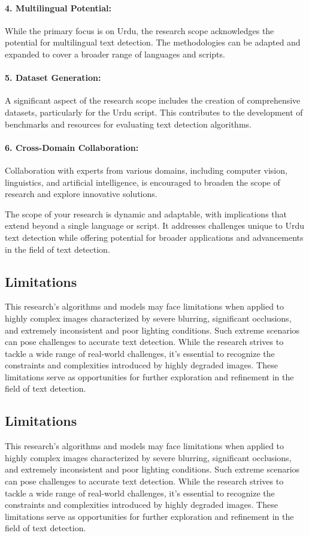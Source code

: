 \paragraph{4. Multilingual Potential:} \hfill \break
While the primary focus is on Urdu, the research scope acknowledges the potential for multilingual text detection. The methodologies can be adapted and expanded to cover a broader range of languages and scripts.

\paragraph{5. Dataset Generation:} \hfill \break
A significant aspect of the research scope includes the creation of comprehensive datasets, particularly for the Urdu script. This contributes to the development of benchmarks and resources for evaluating text detection algorithms.

\paragraph{6. Cross-Domain Collaboration:} \hfill \break
Collaboration with experts from various domains, including computer vision, linguistics, and artificial intelligence, is encouraged to broaden the scope of research and explore innovative solutions.

The scope of your research is dynamic and adaptable, with implications that extend beyond a single language or script. It addresses challenges unique to Urdu text detection while offering potential for broader applications and advancements in the field of text detection.

\subsection{Limitations}
This research's algorithms and models may face limitations when applied to highly complex images characterized by severe blurring, significant occlusions, and extremely inconsistent and poor lighting conditions. Such extreme scenarios can pose challenges to accurate text detection.
While the research strives to tackle a wide range of real-world challenges, it's essential to recognize the constraints and complexities introduced by highly degraded images. These limitations serve as opportunities for further exploration and refinement in the field of text detection.

\subsection{Limitations}
This research's algorithms and models may face limitations when applied to highly complex images characterized by severe blurring, significant occlusions, and extremely inconsistent and poor lighting conditions. Such extreme scenarios can pose challenges to accurate text detection.
While the research strives to tackle a wide range of real-world challenges, it's essential to recognize the constraints and complexities introduced by highly degraded images. These limitations serve as opportunities for further exploration and refinement in the field of text detection.


